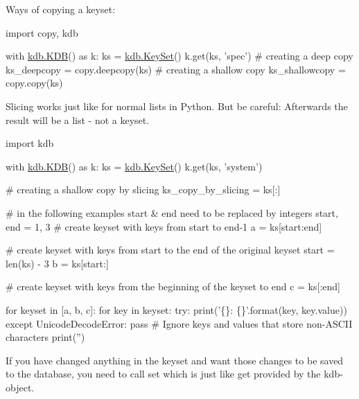 Ways of copying a keyset\+:


\begin{DoxyCode}
\textcolor{keyword}{import} copy, kdb

with \hyperlink{classkdb_1_1KDB}{kdb.KDB}() \textcolor{keyword}{as} k:
    ks = \hyperlink{classkdb_1_1KeySet}{kdb.KeySet}()
    k.get(ks, \textcolor{stringliteral}{'spec'})
    \textcolor{comment}{# creating a deep copy}
    ks\_deepcopy = copy.deepcopy(ks)
    \textcolor{comment}{# creating a shallow copy}
    ks\_shallowcopy = copy.copy(ks)
\end{DoxyCode}


Slicing works just like for normal lists in Python. But be careful\+: Afterwards the result will be a list -\/ not a keyset.


\begin{DoxyCode}
\textcolor{keyword}{import} kdb

with \hyperlink{classkdb_1_1KDB}{kdb.KDB}() \textcolor{keyword}{as} k:
    ks = \hyperlink{classkdb_1_1KeySet}{kdb.KeySet}()
    k.get(ks, \textcolor{stringliteral}{'system'})

    \textcolor{comment}{# creating a shallow copy by slicing}
    ks\_copy\_by\_slicing = ks[:]

    \textcolor{comment}{# in the following examples start & end need to be replaced by integers}
    start, end = 1, 3
    \textcolor{comment}{# create keyset with keys from start to end-1}
    a = ks[start:end]

    \textcolor{comment}{# create keyset with keys from start to the end of the original keyset}
    start = len(ks) - 3
    b = ks[start:]

    \textcolor{comment}{# create keyset with keys from the beginning of the keyset to end}
    c = ks[:end]

    \textcolor{keywordflow}{for} keyset \textcolor{keywordflow}{in} [a, b, c]:
        \textcolor{keywordflow}{for} key \textcolor{keywordflow}{in} keyset:
            \textcolor{keywordflow}{try}:
                print(\textcolor{stringliteral}{'\{\}: \{\}'}.format(key, key.value))
            \textcolor{keywordflow}{except} UnicodeDecodeError:
                \textcolor{keywordflow}{pass}  \textcolor{comment}{# Ignore keys and values that store non-ASCII characters}
        print(\textcolor{stringliteral}{''})
\end{DoxyCode}


If you have changed anything in the keyset and want those changes to be saved to the database, you need to call {\ttfamily set} which is just like {\ttfamily get} provided by the kdb-\/object.

